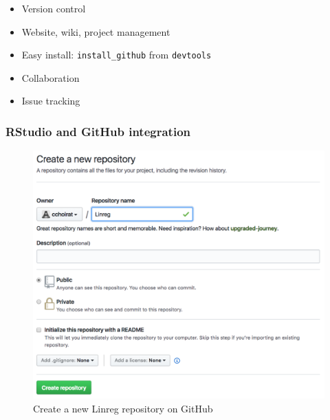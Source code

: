 \documentclass[]{book}
\theoremstyle{definition}
\theoremstyle{definition}
\theoremstyle{definition}
\theoremstyle{remark}
\begin{document}
\begin{itemize}
\item
  Version control
\item
  Website, wiki, project management
\item
  Easy install: \texttt{install\_github} from \texttt{devtools}
\item
  Collaboration
\item
  Issue tracking
\end{itemize}

\subsubsection{RStudio and GitHub
integration}\label{rstudio-and-github-integration}

\begin{figure}

{\centering \includegraphics[width=15in]{images/ch3_pkg_1_github} 

}

\caption{Create a new Linreg repository on GitHub}\label{fig:pkg1}
\end{figure}
\end{document}
